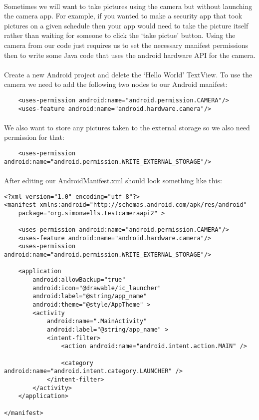\paragraph{} Sometimes we will want to take pictures using the camera but without launching the camera app. For example, if you wanted to make a security app that took pictures on a given schedule then your app would need to take the picture itself rather than waiting for someone to click the `take pictue' button. Using the camera from our code just requires us to set the necessary manifest permissions then to write some Java code that uses the android hardware API for the camera.

\paragraph{} Create a new Android project and delete the `Hello World' TextView. To use the camera we need to add the following two nodes to our Android manifest:

\begin{lstlisting}
    <uses-permission android:name="android.permission.CAMERA"/>
    <uses-feature android:name="android.hardware.camera"/>
\end{lstlisting}

\paragraph{} We also want to store any pictures taken to the external storage so we also need permission for that:

\begin{lstlisting}
    <uses-permission android:name="android.permission.WRITE_EXTERNAL_STORAGE"/>
\end{lstlisting}

\paragraph{} After editing our AndroidManifest.xml should look something like this:

\begin{lstlisting}
<?xml version="1.0" encoding="utf-8"?>
<manifest xmlns:android="http://schemas.android.com/apk/res/android"
    package="org.simonwells.testcameraapi2" >

    <uses-permission android:name="android.permission.CAMERA"/>
    <uses-feature android:name="android.hardware.camera"/>
    <uses-permission android:name="android.permission.WRITE_EXTERNAL_STORAGE"/>

    <application
        android:allowBackup="true"
        android:icon="@drawable/ic_launcher"
        android:label="@string/app_name"
        android:theme="@style/AppTheme" >
        <activity
            android:name=".MainActivity"
            android:label="@string/app_name" >
            <intent-filter>
                <action android:name="android.intent.action.MAIN" />

                <category android:name="android.intent.category.LAUNCHER" />
            </intent-filter>
        </activity>
    </application>

</manifest>
\end{lstlisting}

